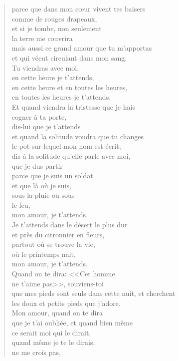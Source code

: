 \documentclass[11pt,a4paper]{book}
\begin{document}
\begin{verse}
parce que dans mon c{\oe}ur vivent tes baisers \\
comme de rouges drapeaux, \\
et si je tombe, non seulement \\
la terre me couvrira \\
mais aussi ce grand amour que tu m'apportas \\
et qui vécut circulant dans mon sang. \\
Tu viendras avec moi, \\
en cette heure je t'attends, \\
en cette heure et en toutes les heures, \\
en toutes les heures je t'attends. \\
Et quand viendra la tristesse que je hais \\
cogner à ta porte, \\
dis-lui que je t'attends \\
et quand la solitude voudra que tu changes \\
le pot sur lequel mon nom est écrit, \\
dis à la solitude qu'elle parle avec moi, \\
que je dus partir \\
parce que je suis un soldat \\
et que là où je suis, \\
sous la pluie ou sous \\
le feu, \\
mon amour, je t'attends. \\
Je t'attends dans le désert le plus dur \\
et près du citronnier en fleurs, \\
partout où se trouve la vie, \\
où le printemps nait, \\
mon amour, je t'attends. \\
Quand on te dira: <<Cet homme \\
ne t'aime pas>>, souviens-toi \\
que mes pieds sont seuls dans cette nuit, et cherchent \\
les doux et petits pieds que j'adore. \\
Mon amour, quand on te dira \\
que je t'ai oubliée, et quand bien même \\
ce serait moi qui le dirait, \\
quand même je te le dirais, \\
ne me crois pas, \\

\end{verse}
\end{document}
